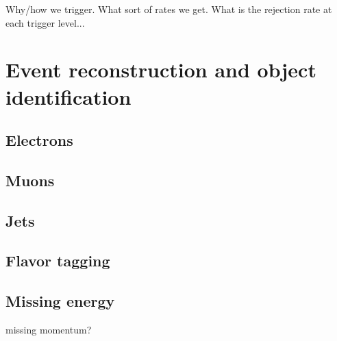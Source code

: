 {\color{red} Why/how we trigger. What sort of rates we get. What is the
rejection rate at each trigger level...}

\section{Event reconstruction and object identification}

\subsection{Electrons} 

\subsection{Muons} 

\subsection{Jets} 

\subsection{Flavor tagging} 

\subsection{Missing energy} 

{\color{red} missing momentum?}
